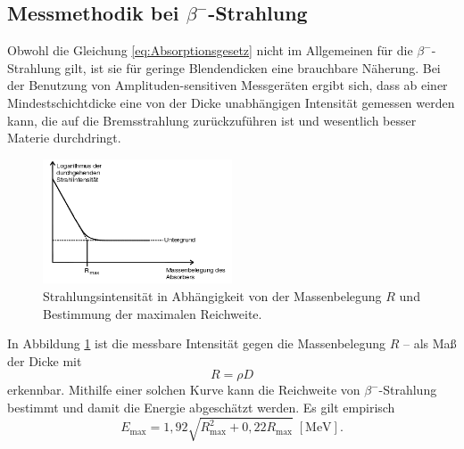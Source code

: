 \subsection{Messmethodik bei \texorpdfstring{$\beta^-$}{Beta}-Strahlung}
Obwohl die Gleichung \eqref{eq:Absorptionsgesetz} nicht im Allgemeinen für die $\beta^-$-Strahlung gilt, ist sie für geringe Blendendicken eine brauchbare Näherung.
Bei der Benutzung von Amplituden-sensitiven Messgeräten ergibt sich, dass ab einer Mindestschichtdicke eine von der Dicke unabhängigen Intensität gemessen werden kann, die auf die Bremsstrahlung zurückzuführen ist und wesentlich besser Materie durchdringt.
\begin{figure}[ht]
	\centering
	\includegraphics[width=0.5\textwidth]{Bilder/absorption.png}
	\caption{Strahlungsintensität in Abhängigkeit von der Massenbelegung $R$ und Bestimmung der maximalen Reichweite.\cite{skript}}
	\label{fig:messkurve}
\end{figure}
In Abbildung \ref{fig:messkurve} ist die messbare Intensität gegen die Massenbelegung $R$ -- als Maß der Dicke mit 
\begin{equation}
R=\rho D
\label{eq:massenbelegung}
\end{equation}
erkennbar.
Mithilfe einer solchen Kurve kann die Reichweite von $\beta^-$-Strahlung bestimmt und damit die Energie abgeschätzt werden.
Es gilt empirisch
\begin{equation}
	E_\text{max}=1,92\sqrt{R_\text{max}^2+0,22R_\text{max}}\;[\si{\mega\electronvolt}].
\label{eq:e_max}
\end{equation}
